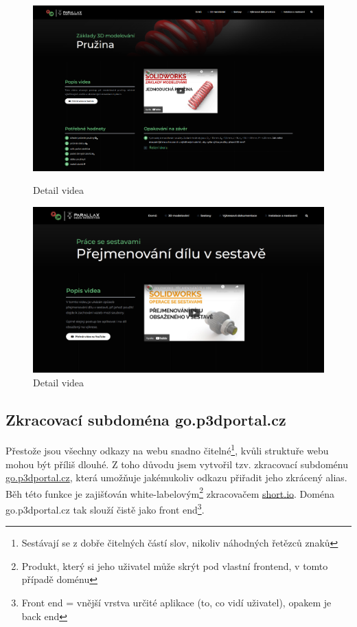 \begin{figure}[htbp]
    \centering
    \begin{minipage}[b]{0.45\textwidth}
        \centering
        \includegraphics[width=1\textwidth]{img/020/web/web-3D.png}
        \caption{Detail videa}
        \label{fig:p3dportal-3D}
    \end{minipage}
    \qquad
    \begin{minipage}[b]{0.45\textwidth}
        \centering
        \includegraphics[width=1\textwidth]{img/020/web/web-assembly.png}
        \caption{Detail videa}
        \label{fig:p3dportal-assembly}
    \end{minipage}
\end{figure}

\subsection{Zkracovací subdoména go.p3dportal.cz}
Přestože jsou všechny odkazy na webu snadno čitelné\footnote{Sestávají se z dobře čitelných částí slov, nikoliv náhodných řetězců znaků}, kvůli struktuře webu mohou být příliš dlouhé.
Z toho důvodu jsem vytvořil tzv. zkracovací subdoménu \href{https://go.p3dportal.cz}{go.p3dportal.cz}, která umožňuje jakémukoliv odkazu přiřadit jeho zkrácený alias.
Běh této funkce je zajišťován white-labelovým\footnote{Produkt, který si jeho uživatel může skrýt pod vlastní frontend, v tomto případě doménu} zkracovačem \href{https://short.io}{short.io}.
Doména go.p3dportal.cz tak slouží čistě jako front end\footnote{Front end = vnější vrstva určité aplikace (to, co vidí uživatel), opakem je back end}.
